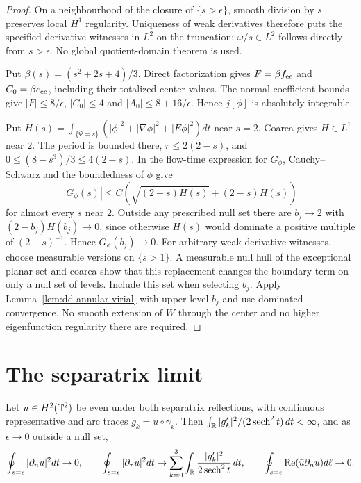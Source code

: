 \begin{proof}
\leanok
On a neighbourhood of the closure of $\{s>\epsilon\}$, smooth division
by $s$ preserves local $H^1$ regularity. Uniqueness of weak derivatives
therefore puts the specified derivative witnesses in $L^2$ on the
truncation; $\omega/s\in L^2$ follows directly from $s>\epsilon$.
No global quotient-domain theorem is used.

Put $\beta(s)=(s^2+2s+4)/3$. Direct factorization gives
$F=\beta f_{\rm ee}$ and $C_0=\beta c_{\rm ee}$, including their
totalized center values. The normal-coefficient bounds give
$|F|\le8/\epsilon$, $|C_0|\le4$ and
$|A_0|\le8+16/\epsilon$. Hence $j[\phi]$ is absolutely integrable.

Put $H(s)=\int_{\{\Psi=s\}}(|\phi|^2+|\nabla\phi|^2+|E\phi|^2)dt$ near
$s=2$. Coarea gives $H\in L^1$ near $2$. The period is bounded there,
$r\le2(2-s)$, and $0\le(8-s^3)/3\le4(2-s)$. In the flow-time expression
for $G_\phi$, Cauchy--Schwarz and the boundedness of $\phi$ give
\[
 |G_\phi(s)|\le C\left(\sqrt{(2-s)H(s)}+(2-s)H(s)\right)
\]
for almost every $s$ near $2$. Outside any prescribed null set there are
$b_j\to2$ with $(2-b_j)H(b_j)\to0$, since otherwise $H(s)$ would dominate
a positive multiple of $(2-s)^{-1}$. Hence $G_\phi(b_j)\to0$.
For arbitrary weak-derivative witnesses, choose measurable versions on
$\{s>1\}$. A measurable null hull of the exceptional planar set and
coarea show that this replacement changes the boundary term on only a
null set of levels. Include this set when selecting $b_j$.
Apply Lemma~\ref{lem:dd-annular-virial} with upper level $b_j$ and use
dominated convergence. No smooth extension of $W$ through the center and
no higher eigenfunction regularity there are required.
\end{proof}

\section{The separatrix limit}

\begin{lemma}
\label{lem:dd-quotient-gradient-traces}
\leanok
Let $u\in H^2(\mathbb{T}^2)$ be even under both separatrix reflections, with
continuous representative and arc traces $g_k=u\circ\gamma_k$. Then
$\int_{\mathbb{R}}|g_k'|^2/(2\operatorname{sech}^2t)\,dt<\infty$, and as $\epsilon\to0$ outside
a null set,
\[
 \oint_{s=\epsilon}|\partial_nu|^2dt\to0,\qquad
 \oint_{s=\epsilon}|\partial_\tau u|^2dt
 \to\sum_{k=0}^3\int_{\mathbb{R}}\frac{|g_k'|^2}{2\operatorname{sech}^2t}\,dt,\qquad
 \oint_{s=\epsilon}\operatorname{Re}(\bar u\partial_nu)d\ell\to0.
\]
\end{lemma}

